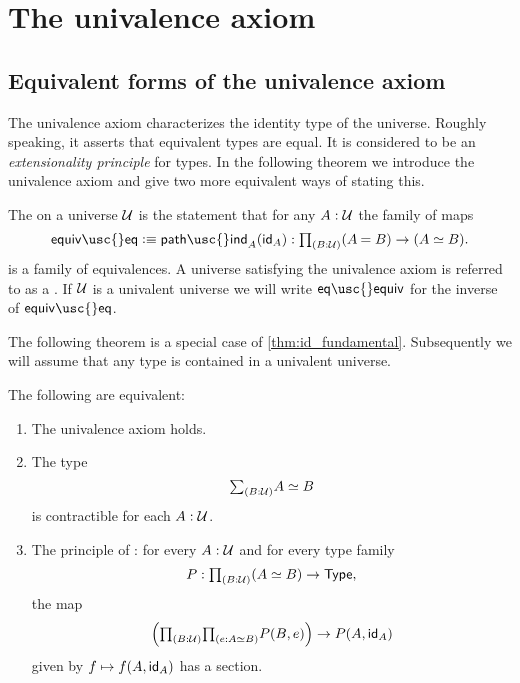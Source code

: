 \section{The univalence axiom}

\subsection{Equivalent forms of the univalence axiom}

The univalence axiom characterizes the identity type of the universe. Roughly speaking, it asserts that equivalent types are equal. It is considered to be an \emph{extensionality principle} for types. In the following theorem we introduce the univalence axiom and give two more equivalent ways of stating this.

\begin{defn}
  The  on a universe $\UU$ is the statement that for any $A:\UU$ the family of maps
\begin{equation*}
\mathsf{equiv\usc{}eq}\defeq \mathsf{path\usc{}ind}_A(\idfunc[A]) : \prd{B:\UU} (\id{A}{B})\to(\eqv{A}{B}).
\end{equation*}
is a family of equivalences. A universe satisfying the univalence axiom is referred to as a . If $\UU$ is a univalent universe we will write
$\mathsf{eq\usc{}equiv}$
for the inverse of $\mathsf{equiv\usc{}eq}$.
\end{defn}

The following theorem is a special case of \cref{thm:id_fundamental}. Subsequently we will assume that any type is contained in a univalent universe.

\begin{thm}\label{thm:univalence}
The following are equivalent:
\begin{enumerate}
\item The univalence axiom holds.
\item The type
\begin{equation*}
\sm{B:\UU}\eqv{A}{B}
\end{equation*}
is contractible for each $A:\UU$.
\item The principle of : for every $A:\UU$ and for every type family
\begin{equation*}
P:\prd{B:\UU} (\eqv{A}{B})\to \mathsf{Type},
\end{equation*}
the map
\begin{equation*}
\Big(\prd{B:\UU}{e:\eqv{A}{B}}P(B,e)\Big)\to P(A,\idfunc[A])
\end{equation*}
given by $f\mapsto f(A,\idfunc[A])$ has a section.
\end{enumerate}
\end{thm}

